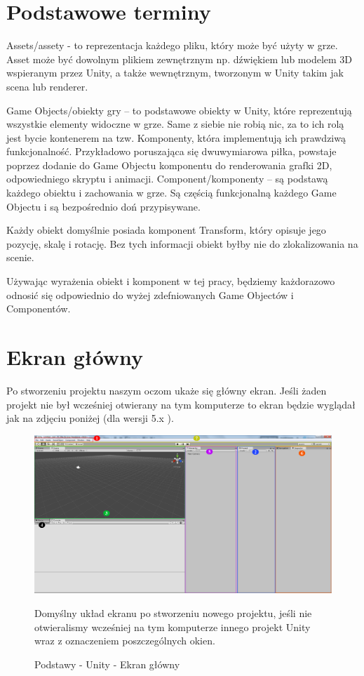 \documentclass[brudnopis]{xmgr}
\begin{document}
\section{Podstawowe terminy}

Assets/assety - to reprezentacja każdego pliku, który może być użyty w grze. Asset może być dowolnym plikiem zewnętrznym np. dźwiękiem lub modelem 3D wspieranym przez Unity, a także wewnętrznym, tworzonym w Unity takim jak scena lub renderer. 

Game Objects/obiekty gry – to podstawowe obiekty w Unity, które reprezentują wszystkie elementy widoczne w grze. Same z siebie nie robią nic, za to ich rolą jest bycie kontenerem na tzw. Komponenty, która implementują ich prawdziwą funkcjonalność. Przykładowo poruszająca się dwuwymiarowa piłka, powstaje poprzez dodanie do Game Objectu komponentu do renderowania grafki 2D, odpowiedniego skryptu i animacji. Component/komponenty – są podstawą każdego obiektu i zachowania w grze. Są częścią funkcjonalną każdego Game Objectu i są bezpośrednio doń przypisywane. 

Każdy obiekt domyślnie posiada komponent Transform, który opisuje jego pozycję, skalę i rotację. Bez tych informacji obiekt byłby nie do zlokalizowania na scenie. 

Używając wyrażenia obiekt i komponent w tej pracy, będziemy każdorazowo odnosić się odpowiednio do wyżej zdefniowanych Game Objectów i Componentów. 

\section{Ekran główny}

Po stworzeniu projektu naszym oczom ukaże się główny ekran. Jeśli żaden projekt nie był wcześniej otwierany na tym komputerze to ekran będzie wyglądał jak na zdjęciu poniżej (dla wersji 5.x ). 

\begin{figure}[!htb]
    \begin{center}
    \includegraphics[scale=0.15]{Screeny/rodzial5screeny/ekran_glowny}
    \end{center}
    \caption{Podstawy - Unity - Ekran główny}
    Domyślny układ ekranu po stworzeniu nowego projektu, jeśli nie otwieralismy wcześniej na tym komputerze innego projekt Unity wraz z oznaczeniem poszczególnych okien.
\end{figure}
\end{document}
